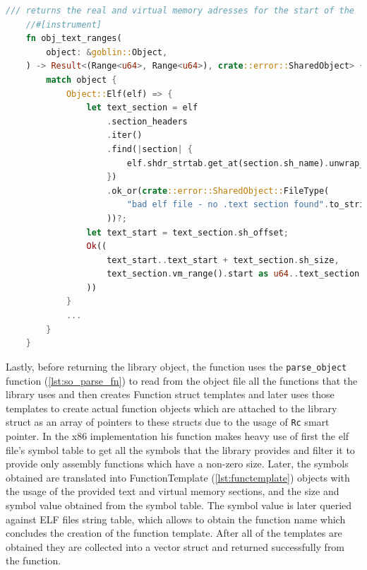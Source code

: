 \begin{lstlisting}[caption=\label{lst:obj-text-ranges}{The function returning object text and virtual memory ranges}, language=Rust, breaklines=true]
    /// returns the real and virtual memory adresses for the start of the `.text` elf file section
    //#[instrument]
    fn obj_text_ranges(
        object: &goblin::Object,
    ) -> Result<(Range<u64>, Range<u64>), crate::error::SharedObject> {
        match object {
            Object::Elf(elf) => {
                let text_section = elf
                    .section_headers
                    .iter()
                    .find(|section| {
                        elf.shdr_strtab.get_at(section.sh_name).unwrap_or("") == ".text"
                    })
                    .ok_or(crate::error::SharedObject::FileType(
                        "bad elf file - no .text section found".to_string(),
                    ))?;
                let text_start = text_section.sh_offset;
                Ok((
                    text_start..text_start + text_section.sh_size,
                    text_section.vm_range().start as u64..text_section.vm_range().end as u64,
                ))
            }
            ...
        }
    }
\end{lstlisting}

Lastly, before returning the library object, the function uses the \verb|parse_object| function (\autoref{lst:so_parse_fn}) to read from the object file all the functions that the library uses and then creates Function struct templates and later uses those templates to create actual function objects which are attached to the library struct as an array of pointers to these structs due to the usage of \verb|Rc| smart pointer.
In the x86 implementation his function makes heavy use of first the elf file's symbol table to get all the symbols that the library provides and filter it to provide only assembly functions which have a non-zero size.
Later, the symbols obtained are translated into FunctionTemplate (\autoref{lst:functemplate}) objects with the usage of the provided text and virtual memory sections, and the size and symbol value obtained from the symbol table. 
The symbol value is later queried against ELF files string table, which allows to obtain the function name which concludes the creation of the function template.
After all of the templates are obtained they are collected into a vector struct and returned successfully from the function.


